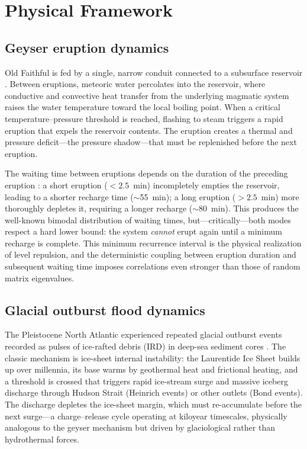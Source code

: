 \documentclass[12pt,a4paper]{article}
\begin{document}
\section{Physical Framework}

\subsection{Geyser eruption dynamics}

Old Faithful is fed by a single, narrow conduit connected to a subsurface reservoir \citep{hurwitz2014}. Between eruptions, meteoric water percolates into the reservoir, where conductive and convective heat transfer from the underlying magmatic system raises the water temperature toward the local boiling point. When a critical temperature--pressure threshold is reached, flashing to steam triggers a rapid eruption that expels the reservoir contents. The eruption creates a thermal and pressure deficit---the pressure shadow---that must be replenished before the next eruption.

The waiting time between eruptions depends on the duration of the preceding eruption \citep{azzalini1990}: a short eruption ($<2.5$~min) incompletely empties the reservoir, leading to a shorter recharge time ($\sim$55~min); a long eruption ($>2.5$~min) more thoroughly depletes it, requiring a longer recharge ($\sim$80~min). This produces the well-known bimodal distribution of waiting times, but---critically---both modes respect a hard lower bound: the system \emph{cannot} erupt again until a minimum recharge is complete. This minimum recurrence interval is the physical realization of level repulsion, and the deterministic coupling between eruption duration and subsequent waiting time imposes correlations even stronger than those of random matrix eigenvalues.

\subsection{Glacial outburst flood dynamics}

The Pleistocene North Atlantic experienced repeated glacial outburst events recorded as pulses of ice-rafted debris (IRD) in deep-sea sediment cores \citep{bond1999,hemming2004}. The classic mechanism is ice-sheet internal instability: the Laurentide Ice Sheet builds up over millennia, its base warms by geothermal heat and frictional heating, and a threshold is crossed that triggers rapid ice-stream surge and massive iceberg discharge through Hudson Strait (Heinrich events) or other outlets (Bond events). The discharge depletes the ice-sheet margin, which must re-accumulate before the next surge---a charge--release cycle operating at kiloyear timescales, physically analogous to the geyser mechanism but driven by glaciological rather than hydrothermal forces.
\end{document}

